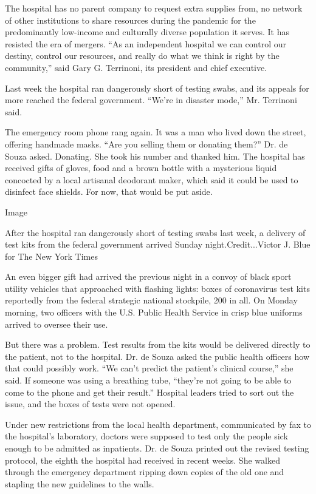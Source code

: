 The hospital has no parent company to request extra supplies from, no
network of other institutions to share resources during the pandemic for
the predominantly low-income and culturally diverse population it
serves. It has resisted the era of mergers. ``As an independent hospital
we can control our destiny, control our resources, and really do what we
think is right by the community,'' said Gary G. Terrinoni, its president
and chief executive.

Last week the hospital ran dangerously short of testing swabs, and its
appeals for more reached the federal government. ``We're in disaster
mode,'' Mr. Terrinoni said.

The emergency room phone rang again. It was a man who lived down the
street, offering handmade masks. ``Are you selling them or donating
them?'' Dr. de Souza asked. Donating. She took his number and thanked
him. The hospital has received gifts of gloves, food and a brown bottle
with a mysterious liquid concocted by a local artisanal deodorant maker,
which said it could be used to disinfect face shields. For now, that
would be put aside.

Image

After the hospital ran dangerously short of testing swabs last week, a
delivery of test kits from the federal government arrived Sunday
night.Credit...Victor J. Blue for The New York Times

An even bigger gift had arrived the previous night in a convoy of black
sport utility vehicles that approached with flashing lights: boxes of
coronavirus test kits reportedly from the federal strategic national
stockpile, 200 in all. On Monday morning, two officers with the U.S.
Public Health Service in crisp blue uniforms arrived to oversee their
use.

But there was a problem. Test results from the kits would be delivered
directly to the patient, not to the hospital. Dr. de Souza asked the
public health officers how that could possibly work. ``We can't predict
the patient's clinical course,'' she said. If someone was using a
breathing tube, ``they're not going to be able to come to the phone and
get their result.'' Hospital leaders tried to sort out the issue, and
the boxes of tests were not opened.

Under new restrictions from the local health department, communicated by
fax to the hospital's laboratory, doctors were supposed to test only the
people sick enough to be admitted as inpatients. Dr. de Souza printed
out the revised testing protocol, the eighth the hospital had received
in recent weeks. She walked through the emergency department ripping
down copies of the old one and stapling the new guidelines to the walls.

